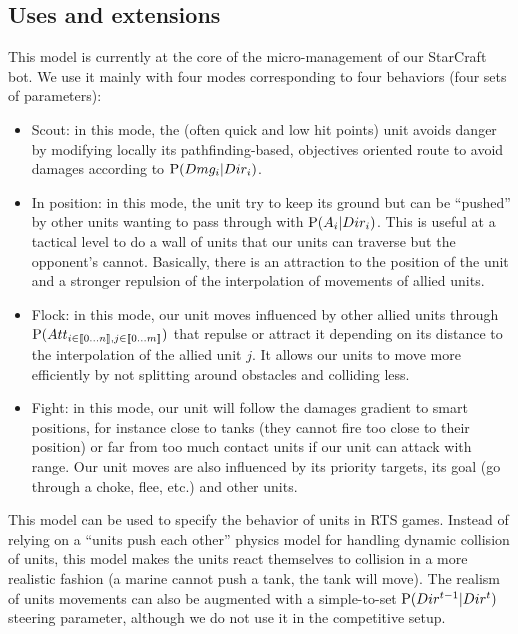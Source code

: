 \subsection{Uses and extensions}
This model is currently at the core of the micro-management of our StarCraft bot. We use it mainly with four modes corresponding to four behaviors (four sets of parameters):
\begin{itemize}
\item Scout: in this mode, the (often quick and low hit points) unit avoids danger by modifying locally its pathfinding-based, objectives oriented route to avoid damages according to $\mathrm{P}(Dmg_i|Dir_i)$.
\item In position: in this mode, the unit try to keep its ground but can be ``pushed'' by other units wanting to pass through with $\mathrm{P}(A_i | Dir_i)$. This is useful at a tactical level to do a wall of units that our units can traverse but the opponent's cannot. Basically, there is an attraction to the position of the unit and a stronger repulsion of the interpolation of movements of allied units.
\item Flock: in this mode, our unit moves influenced by other allied units through $\mathrm{P}(Att_{i \in \llbracket 0 \dots n\rrbracket, j \in \llbracket 0 \dots m \rrbracket})$ that repulse or attract it depending on its distance to the interpolation of the allied unit $j$. It allows our units to move more efficiently by not splitting around obstacles and colliding less.
\item Fight: in this mode, our unit will follow the damages gradient to smart positions, for instance close to tanks (they cannot fire too close to their position) or far from too much contact units if our unit can attack with range. Our unit moves are also influenced by its priority targets, its goal (go through a choke, flee, etc.) and other units.
\end{itemize}

This model can be used to specify the behavior of units in RTS games. Instead of relying on a ``units push each other'' physics model for handling dynamic collision of units, this model makes the units react themselves to collision in a more realistic fashion (a marine cannot push a tank, the tank will move). The realism of units movements can also be augmented with a simple-to-set $\mathrm{P}(Dir^{t-1}|Dir^t)$ steering parameter, although we do not use it in the competitive setup.



